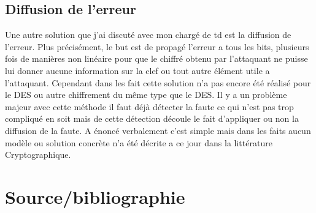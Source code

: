 \documentclass[a4paper]{report}
\begin{document}
			\section{Diffusion de l'erreur}
				Une autre solution que j'ai discuté avec mon chargé de td est la diffusion de l'erreur. Plus précisément, le but est de propagé l'erreur a tous les bits, plusieurs fois de manières non linéaire pour que le chiffré obtenu par l'attaquant ne puisse lui donner aucune information sur la clef ou tout autre élément utile a l'attaquant.
				Cependant dans les fait cette solution n'a pas encore été réalisé pour le DES ou autre chiffrement du même type que le DES. Il y a un problème majeur avec cette méthode il faut déjà détecter la faute ce qui n'est pas trop compliqué en soit mais de cette détection découle le fait d'appliquer ou non la diffusion de la faute. A énoncé verbalement c'est simple mais dans les faits aucun modèle ou solution concrète n'a été décrite a ce jour dans la littérature Cryptographique.
		
		\chapter{Source/bibliographie}


		
\end{document}
